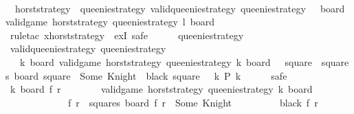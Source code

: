 \begin{isabellebody}
\ \ \isamarkupfalse%
\ {\isachardoublequoteopen}{\isasymexists}\ horst{\isacharunderscore}strategy{\isachardot}\ {\isasymforall}\ queenie{\isacharunderscore}strategy{\isachardot}\ valid{\isacharunderscore}queenie{\isacharunderscore}strategy\ queenie{\isacharunderscore}strategy\ {\isasymlongrightarrow}\ {\isacharparenleft}{\isasymexists}\ board{\isachardot}\ valid{\isacharunderscore}game\ horst{\isacharunderscore}strategy\ queenie{\isacharunderscore}strategy\ {\isacharquery}l\ board{\isacharparenright}{\isachardoublequoteclose}\isanewline
\ \ \isamarkupfalse%
\ {\isacharparenleft}rule{\isacharunderscore}tac\ x{\isacharequal}{\isachardoublequoteopen}{\isacharquery}horst{\isacharunderscore}strategy{\isachardoublequoteclose}\ \ exI{\isacharcomma}\ safe{\isacharparenright}\isanewline
\ \ \ \ \isamarkupfalse%
\ queenie{\isacharunderscore}strategy\isanewline
\ \ \ \ \isamarkupfalse%
\ {\isachardoublequoteopen}valid{\isacharunderscore}queenie{\isacharunderscore}strategy\ queenie{\isacharunderscore}strategy{\isachardoublequoteclose}\isanewline
\isanewline
\ \ \ \ \isamarkupfalse%
\ {}{\isacharcolon}\ {\isachardoublequoteopen}{\isasymforall}\ k\ board{\isachardot}\ valid{\isacharunderscore}game\ {\isacharquery}horst{\isacharunderscore}strategy\ queenie{\isacharunderscore}strategy\ k\ board\ {\isasymlongrightarrow}\ {\isacharparenleft}{\isasymforall}\ square\ {\isasymin}\ squares{\isachardot}\ board\ square\ {\isacharequal}\ Some\ Knight\ {\isasymlongrightarrow}\ black\ square{\isacharparenright}{\isachardoublequoteclose}\ {\isacharparenleft}\ {\isachardoublequoteopen}{\isasymforall}\ k{\isachardot}\ {\isacharquery}P\ k{\isachardoublequoteclose}{\isacharparenright}\isanewline
\ \ \ \ \isamarkupfalse%
\ safe\isanewline
\ \ \ \ \ \ \isamarkupfalse%
\ k\ board\ f\ r\isanewline
\ \ \ \ \ \ \isamarkupfalse%
\ {\isachardoublequoteopen}valid{\isacharunderscore}game\ {\isacharquery}horst{\isacharunderscore}strategy\ queenie{\isacharunderscore}strategy\ k\ board{\isachardoublequoteclose}\isanewline
\ \ \ \ \ \ \ \ \ \ \ \ \ {\isachardoublequoteopen}{\isacharparenleft}f{\isacharcomma}\ r{\isacharparenright}\ {\isasymin}\ squares{\isachardoublequoteclose}\ {\isachardoublequoteopen}board\ {\isacharparenleft}f{\isacharcomma}\ r{\isacharparenright}\ {\isacharequal}\ Some\ Knight{\isachardoublequoteclose}\isanewline
\ \ \ \ \ \ \isamarkupfalse%
\ \isamarkupfalse%
\ {\isachardoublequoteopen}black\ {\isacharparenleft}f{\isacharcomma}\ r{\isacharparenright}{\isachardoublequoteclose}\isanewline

\end{isabellebody}
